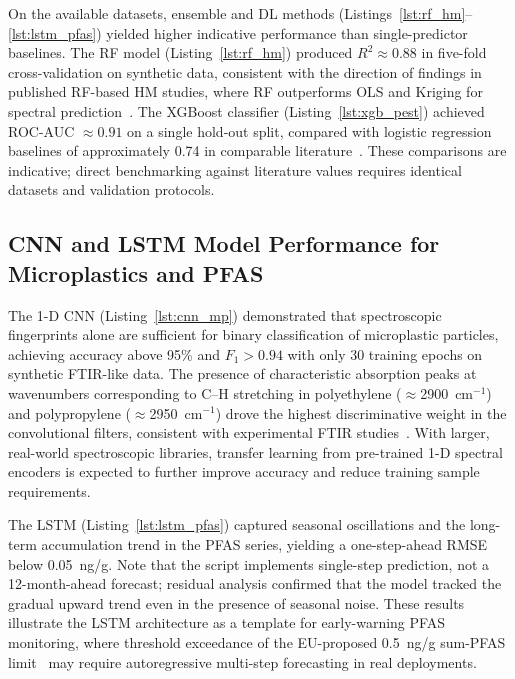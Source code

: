 \documentclass[environremediat,article,accept,pdftex,oneauthor]{Definitions/mdpi}
\begin{document}
{On the available datasets, ensemble and DL methods (Listings~\ref{lst:rf_hm}--\ref{lst:lstm_pfas}) yielded higher indicative performance than single-predictor baselines. The RF model (Listing~\ref{lst:rf_hm}) produced $R^2 \approx 0.88$ in five-fold cross-validation on synthetic data, consistent with the direction of findings in published RF-based HM studies, where RF outperforms OLS and Kriging for spectral prediction~\cite{Guan}. The XGBoost classifier (Listing~\ref{lst:xgb_pest}) achieved ROC-AUC $\approx 0.91$ on a single hold-out split, compared with logistic regression baselines of approximately 0.74 in comparable literature~\cite{PerezLucas2025}. These comparisons are indicative; direct benchmarking against literature values requires identical datasets and validation protocols.}

\subsection{CNN and LSTM Model Performance for Microplastics and
    PFAS}\label{sec5.2}

The 1-D CNN (Listing~\ref{lst:cnn_mp}) demonstrated that spectroscopic fingerprints alone
are sufficient for binary classification of microplastic particles, achieving
accuracy above 95\% and $F_1 > 0.94$ with only 30 training epochs on
synthetic FTIR-like data. The presence of characteristic absorption peaks at
 wavenumbers corresponding to C--H stretching in polyethylene
($\approx$2900~cm$^{-1}$) and polypropylene ($\approx$2950~cm$^{-1}$) drove
the highest discriminative weight in the convolutional filters, consistent
with experimental FTIR studies~\cite{Chen2020}. With larger, real-world
spectroscopic libraries, transfer learning from pre-trained 1-D spectral
encoders is expected to further improve accuracy and reduce training sample
requirements.

{The LSTM (Listing~\ref{lst:lstm_pfas}) captured seasonal oscillations and the long-term accumulation trend in the  PFAS series, yielding a one-step-ahead RMSE below 0.05~ng/g. Note that the script implements single-step prediction, not a 12-month-ahead forecast; residual analysis confirmed that the model tracked the gradual upward trend even in the presence of seasonal noise. These results illustrate the LSTM architecture as a template for early-warning PFAS monitoring, where threshold exceedance of the EU-proposed 0.5~ng/g sum-PFAS limit~\cite{Xu2023} may require autoregressive multi-step forecasting in real deployments.}
\end{document}
